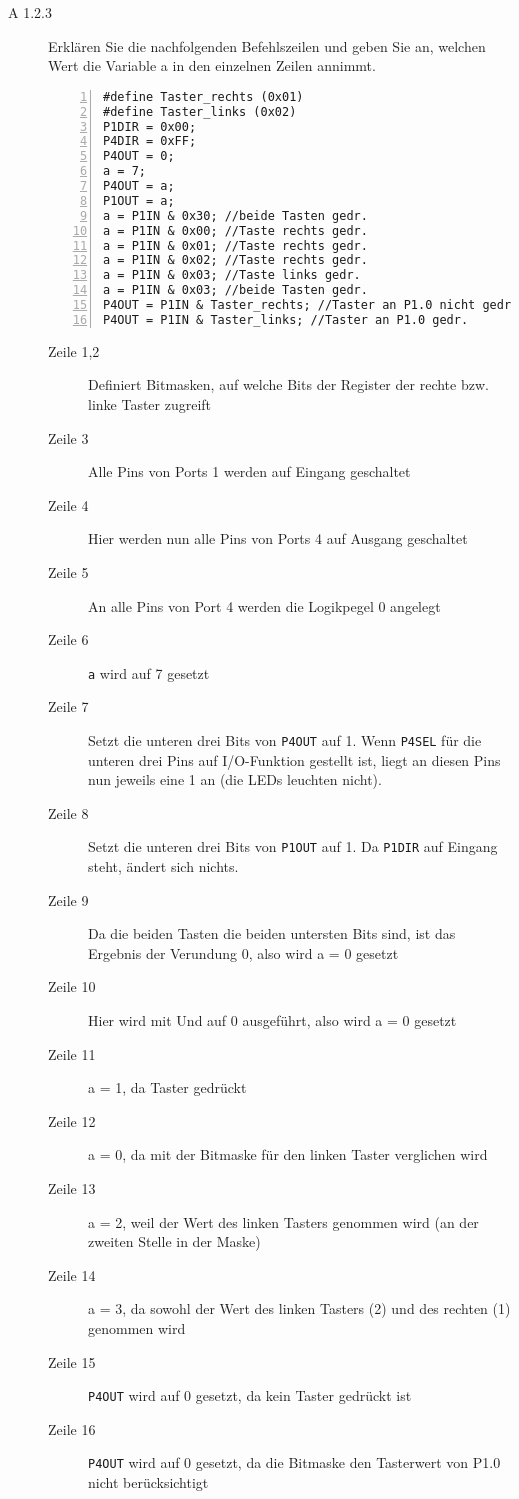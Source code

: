 \documentclass[11pt,a4paper,ngerman]{article}
\begin{document}
\begin{description}
	\item[A 1.2.3] Erklären Sie die nachfolgenden Befehlszeilen und geben Sie an, welchen Wert die Variable a in den einzelnen Zeilen annimmt. \\
	
	\begin{lstlisting}[numbers=left]
#define Taster_rechts (0x01)
#define Taster_links (0x02)
P1DIR = 0x00;
P4DIR = 0xFF;
P4OUT = 0;
a = 7;
P4OUT = a;
P1OUT = a;
a = P1IN & 0x30; //beide Tasten gedr.
a = P1IN & 0x00; //Taste rechts gedr.
a = P1IN & 0x01; //Taste rechts gedr.
a = P1IN & 0x02; //Taste rechts gedr.
a = P1IN & 0x03; //Taste links gedr.
a = P1IN & 0x03; //beide Tasten gedr.
P4OUT = P1IN & Taster_rechts; //Taster an P1.0 nicht gedr.
P4OUT = P1IN & Taster_links; //Taster an P1.0 gedr.
	\end{lstlisting}
	\begin{description}
		\item[Zeile 1,2] Definiert Bitmasken, auf welche Bits der Register der rechte bzw. linke Taster zugreift
		\item[Zeile 3] Alle Pins von Ports 1 werden auf Eingang geschaltet
		\item[Zeile 4] Hier werden nun alle Pins von Ports 4 auf Ausgang geschaltet
		\item[Zeile 5] An alle Pins von Port 4 werden die Logikpegel 0 angelegt
		\item[Zeile 6] \texttt{a} wird auf 7 gesetzt
		\item[Zeile 7] Setzt die unteren drei Bits von \texttt{P4OUT} auf 1. Wenn \texttt{P4SEL} für die unteren drei Pins auf I/O-Funktion gestellt ist, liegt an diesen Pins nun jeweils eine 1 an (die LEDs leuchten nicht).
		\item[Zeile 8] Setzt die unteren drei Bits von \texttt{P1OUT} auf 1. Da \texttt{P1DIR} auf Eingang steht, ändert sich nichts.
		\item[Zeile 9] Da die beiden Tasten die beiden untersten Bits sind, ist das Ergebnis der Verundung 0, also wird a = 0 gesetzt
		\item[Zeile 10] Hier wird mit Und auf 0 ausgeführt, also wird a = 0 gesetzt
		\item[Zeile 11] a = 1, da Taster gedrückt
		\item[Zeile 12] a = 0, da mit der Bitmaske für den linken Taster verglichen wird
		\item[Zeile 13] a = 2, weil der Wert des linken Tasters genommen wird (an der zweiten Stelle in der Maske)
		\item[Zeile 14] a = 3, da sowohl der Wert des linken Tasters (2) und des rechten (1) genommen wird
		\item[Zeile 15] \texttt{P4OUT} wird auf 0 gesetzt, da kein Taster gedrückt ist
		\item[Zeile 16] \texttt{P4OUT} wird auf 0 gesetzt, da die Bitmaske den Tasterwert von P1.0 nicht berücksichtigt
	\end{description}
	

\end{description}
\end{document}
